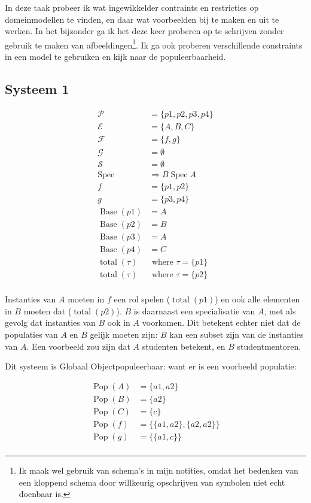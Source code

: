\documentclass[11pt]{article}
\newcommand{\Spec}{\ensuremath{\operatorname{Spec}}}
\newcommand{\Base}{\ensuremath{\operatorname{Base}}}
\newcommand{\total}{\ensuremath{\operatorname{total}}}
\newcommand{\Pop}{\ensuremath{\operatorname{Pop}}}
\begin{document}
In deze taak probeer ik wat ingewikkelder contraints en restricties op
domeinmodellen te vinden, en daar wat voorbeelden bij te maken en uit te
werken. In het bijzonder ga ik het deze keer proberen op te schrijven zonder
gebruik te maken van afbeeldingen\footnote{Ik maak wel gebruik van schema's in
mijn notities, omdat het bedenken van een kloppend schema door willkeurig
opschrijven van symbolen niet echt doenbaar is.}. Ik ga ook proberen
verschillende constraints in een model te gebruiken en kijk naar de
populeerbaarheid.

\subsection{Systeem 1}
\begin{align*}
  \mathcal{P}    & = \{p1,p2,p3,p4\}\\
  \mathcal{E} & = \{A,B,C\} \\
  \mathcal{F} & = \{f,g\}   \\
  \mathcal{G} & = \emptyset        \\  
  \mathcal{S} & = \emptyset        \\
  \Spec       &\Rightarrow B \Spec A       \\
  f           & = \{p1,p2\} \\   
  g           & = \{p3,p4\} \\
  \Base (p1)   & = A         \\
  \Base (p2)   & = B         \\
  \Base (p3)   & = A         \\
  \Base (p4)   & = C        \\ 
  \total (\tau) &\text{ where } \tau = \{p1\} \\
  \total (\tau) &\text{ where } \tau = \{p2\} \\
\end{align*}

Instanties van $A$ moeten in $f$ een rol spelen ($\total (p1)$) en ook alle
elementen in $B$ moeten dat ($\total (p2)$). $B$ is daarnaast een specialisatie
van $A$, met als gevolg dat instanties van $B$ ook in $A$ voorkomen. Dit
betekent echter niet dat de populaties van $A$ en $B$ gelijk moeten zijn: $B$
kan een subset zijn van de instanties van $A$. Een voorbeeld zou zijn dat $A$
studenten betekent, en $B$ studentmentoren.

Dit systeem is Globaal Objectpopuleerbaar: want er is een voorbeeld populatie:

\begin{align*}
  \Pop (A) & = \{a1,a2\}                 \\
  \Pop (B) & = \{a2\}                    \\
  \Pop (C) & = \{c\}                     \\
  \Pop (f) & = \{ \{a1,a2\}, \{a2,a2\}\} \\
  \Pop (g) & = \{ \{a1,c \} \}           \\
\end{align*}
\end{document}
